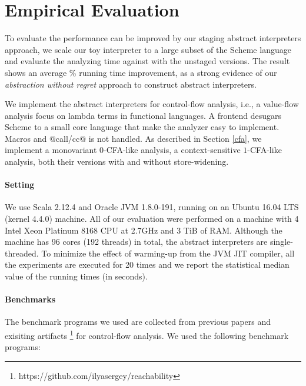 \section{Empirical Evaluation} \label{evaluation}

To evaluate the performance can be improved by our staging abstract interpreters
approach, we scale our toy interpreter to a large subset of the Scheme language
and evaluate the analyzing time against with the unstaged versions. The result
shows an average \% running time improvement, as a strong evidence of
our \textit{abstraction without regret} approach to construct abstract
interpreters.

We implement the abstract interpreters for control-flow analysis, i.e., a
value-flow analysis focus on lambda terms in functional languages. A frontend
desugars Scheme to a small core language that make the analyzer easy to
implement. Macros and @call/cc@ is not handled. As described in Section
\ref{cfa}, we implement a monovariant 0-CFA-like analysis, a context-sensitive
$1$-CFA-like analysis, both their versions with and without store-widening.

\paragraph{Setting}

We use Scala 2.12.4 and Oracle JVM 1.8.0-191, running on an Ubuntu 16.04 LTS
(kernel 4.4.0) machine. All of our evaluation were performed on a machine with 4 Intel
Xeon Platinum 8168 CPU at 2.7GHz and 3 TiB of RAM. Although the machine has 96
cores (192 threads) in total, the abstract interpreters are single-threaded.
To minimize the effect of warming-up from the JVM JIT compiler, all the
experiments are executed for 20 times and we report the statistical median value
of the running times (in seconds).

\paragraph{Benchmarks} 
The benchmark programs we used are collected from previous papers
\cite{Johnson:2013:OAA:2500365.2500604, ashley:practical,
DBLP:journals/corr/abs-1102-3676} and exisiting artifacts
\footnote{https://github.com/ilyasergey/reachability} for control-flow analysis.
We used the following benchmark programs:

